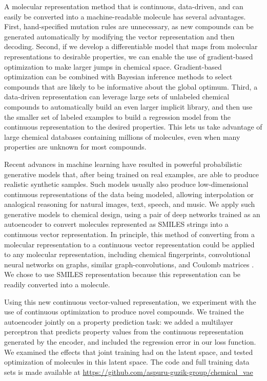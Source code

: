 A molecular representation method that is continuous, data-driven, and can easily be converted into a machine-readable molecule has several advantages.
First, hand-specified mutation rules are unnecessary, as new compounds can be generated automatically by modifying the vector representation and then decoding.
Second, if we develop a differentiable model that maps from molecular representations to desirable properties, we can enable the use of gradient-based optimization to make larger jumps in chemical space.
Gradient-based optimization can be combined with Bayesian inference methods to select compounds that are likely to be informative about the global optimum.
Third, a data-driven representation can leverage large sets of unlabeled chemical compounds to automatically build an even larger implicit library, and then use the smaller set of labeled examples to build a regression model from the continuous representation to the desired properties.
This lets us take advantage of large chemical databases containing millions of molecules, even when many properties are unknown for most compounds.

Recent advances in machine learning have resulted in powerful probabilistic generative models that, after being trained on real examples, are able to produce realistic synthetic samples.
Such models usually also produce low-dimensional continuous representations of the data being modeled, allowing interpolation or analogical reasoning for
natural images\cite{radford2015unsupervised}, text\cite{bowman2015generating}, speech, and music\cite{vandenoord_2016,Engel2017NeuralAudio}.
We apply such generative models to chemical design, using a pair of deep networks trained as an autoencoder to convert molecules represented as SMILES strings into a continuous vector representation. In principle, this method of converting from a molecular representation to a continuous vector representation could be applied to any molecular representation, including
chemical fingerprints,\cite{ECFP2010}
convolutional neural networks on graphs\cite{duvenaud2015convolutional},
 similar graph-convolutions\cite{kearnes2016molecular}, and
 Coulomb matrices \cite{Rupp_2012}. We chose to use SMILES representation because this representation can be readily converted into a molecule.

Using this new continuous vector-valued representation, we experiment with the use of continuous optimization to produce novel compounds. We trained the autoencoder jointly on a property prediction task: we added a multilayer perceptron that predicts property values from the continuous representation generated by the encoder, and included the regression error in our loss function. We examined the effects that joint training had on the latent space, and tested optimization of molecules in this latent space.
The code and full training data sets is made available at \url{https://github.com/aspuru-guzik-group/chemical_vae}

